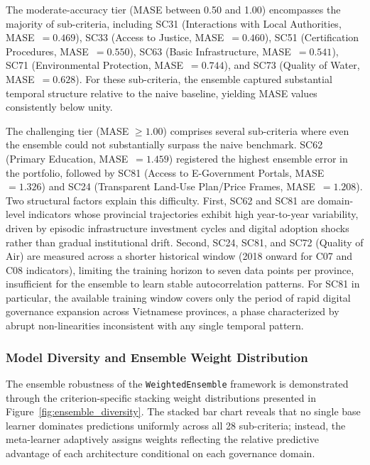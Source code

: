 \documentclass[12pt,a4paper]{article}
\begin{document}
The moderate-accuracy tier (MASE between 0.50 and 1.00) encompasses the majority of sub-criteria, including SC31 (Interactions with Local Authorities, MASE~$= 0.469$), SC33 (Access to Justice, MASE~$= 0.460$), SC51 (Certification Procedures, MASE~$= 0.550$), SC63 (Basic Infrastructure, MASE~$= 0.541$), SC71 (Environmental Protection, MASE~$= 0.744$), and SC73 (Quality of Water, MASE~$= 0.628$). For these sub-criteria, the ensemble captured substantial temporal structure relative to the naive baseline, yielding MASE values consistently below unity.

The challenging tier (MASE $\geq 1.00$) comprises several sub-criteria where even the ensemble could not substantially surpass the naive benchmark. SC62 (Primary Education, MASE~$= 1.459$) registered the highest ensemble error in the portfolio, followed by SC81 (Access to E-Government Portals, MASE~$= 1.326$) and SC24 (Transparent Land-Use Plan/Price Frames, MASE~$= 1.208$). Two structural factors explain this difficulty. First, SC62 and SC81 are domain-level indicators whose provincial trajectories exhibit high year-to-year variability, driven by episodic infrastructure investment cycles and digital adoption shocks rather than gradual institutional drift. Second, SC24, SC81, and SC72 (Quality of Air) are measured across a shorter historical window (2018 onward for C07 and C08 indicators), limiting the training horizon to seven data points per province, insufficient for the ensemble to learn stable autocorrelation patterns. For SC81 in particular, the available training window covers only the period of rapid digital governance expansion across Vietnamese provinces, a phase characterized by abrupt non-linearities inconsistent with any single temporal pattern.

\subsubsection{Model Diversity and Ensemble Weight Distribution}

The ensemble robustness of the \texttt{WeightedEnsemble} framework is demonstrated through the criterion-specific stacking weight distributions presented in Figure~\ref{fig:ensemble_diversity}. The stacked bar chart reveals that no single base learner dominates predictions uniformly across all 28 sub-criteria; instead, the meta-learner adaptively assigns weights reflecting the relative predictive advantage of each architecture conditional on each governance domain.
\end{document}
